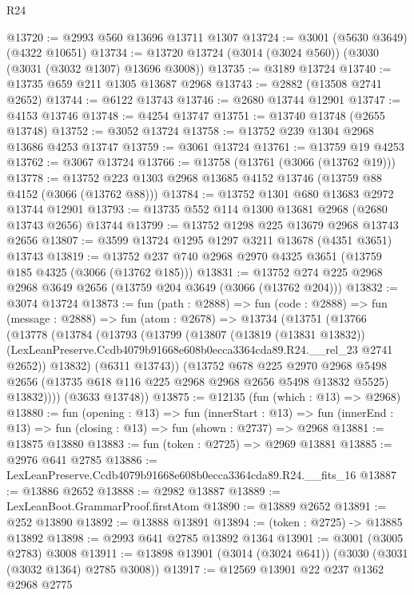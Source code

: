 \begin{lexlean}{R24}
\begin{coremodule}
@13720 := @2993 @560 @13696 @13711 @1307
@13724 := @3001 (@5630 @3649) (@4322 @10651)
@13734 := @13720 @13724 (@3014 (@3024 @560)) (@3030 (@3031 (@3032 @1307) @13696 @3008))
@13735 := @3189 @13724
@13740 := @13735 @659 @211 @1305 @13687 @2968
@13743 := @2882 (@13508 @2741 @2652)
@13744 := @6122 @13743
@13746 := @2680 @13744 @12901
@13747 := @4153 @13746
@13748 := @4254 @13747
@13751 := @13740 @13748 (@2655 @13748)
@13752 := @3052 @13724
@13758 := @13752 @239 @1304 @2968 @13686 @4253 @13747
@13759 := @3061 @13724
@13761 := @13759 @19 @4253
@13762 := @3067 @13724
@13766 := @13758 (@13761 (@3066 (@13762 @19)))
@13778 := @13752 @223 @1303 @2968 @13685 @4152 @13746 (@13759 @88 @4152 (@3066 (@13762 @88)))
@13784 := @13752 @1301 @680 @13683 @2972 @13744 @12901
@13793 := @13735 @552 @114 @1300 @13681 @2968 (@2680 @13743 @2656) @13744
@13799 := @13752 @1298 @225 @13679 @2968 @13743 @2656
@13807 := @3599 @13724 @1295 @1297 @3211 @13678 (@4351 @3651) @13743
@13819 := @13752 @237 @740 @2968 @2970 @4325 @3651 (@13759 @185 @4325 (@3066 (@13762 @185)))
@13831 := @13752 @274 @225 @2968 @2968 @3649 @2656 (@13759 @204 @3649 (@3066 (@13762 @204)))
@13832 := @3074 @13724
@13873 := fun (path : @2888) =>
  fun (code : @2888) =>
  fun (message : @2888) =>
  fun (atom : @2678) =>
  @13734
    (@13751
      (@13766
        (@13778
          (@13784
            (@13793
              (@13799
                (@13807
                  (@13819 (@13831 @13832))
                  (LexLeanPreserve.Ccdb4079b91668e608b0ecca3364cda89.R24.__rel_23 @2741 @2652))
                @13832)
              (@6311 @13743))
            (@13752
              @678
              @225
              @2970
              @2968
              @5498
              @2656
              (@13735 @618 @116 @225 @2968 @2968 @2656 @5498 @13832 @5525)
              @13832))))
      (@3633 @13748))
@13875 := @12135 (fun (which : @13) => @2968)
@13880 := fun (opening : @13) =>
  fun (innerStart : @13) =>
  fun (innerEnd : @13) => fun (closing : @13) => fun (shown : @2737) => @2968
@13881 := @13875 @13880
@13883 := fun (token : @2725) => @2969 @13881
@13885 := @2976 @641 @2785
@13886 := LexLeanPreserve.Ccdb4079b91668e608b0ecca3364cda89.R24.__fits_16
@13887 := @13886 @2652
@13888 := @2982 @13887
@13889 := LexLeanBoot.GrammarProof.firstAtom
@13890 := @13889 @2652
@13891 := @252 @13890
@13892 := @13888 @13891
@13894 := (token : @2725) -> @13885 @13892
@13898 := @2993 @641 @2785 @13892 @1364
@13901 := @3001 (@3005 @2783) @3008
@13911 := @13898 @13901 (@3014 (@3024 @641)) (@3030 (@3031 (@3032 @1364) @2785 @3008))
@13917 := @12569 @13901 @22 @237 @1362 @2968 @2775

\end{coremodule}
\end{lexlean}
